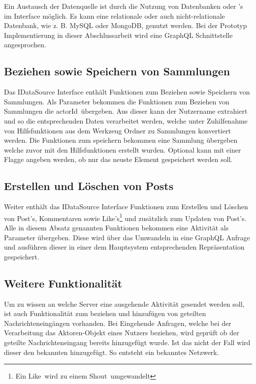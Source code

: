 Ein Austausch der Datenquelle ist durch die Nutzung von Datenbanken oder 's im Interface möglich. Es kann eine relationale oder auch nicht-relationale Datenbank, wie z. B. MySQL oder MongoDB, genutzt werden. Bei der Prototyp Implementierung in dieser Abschlussarbeit wird eine GraphQL Schnittstelle angesprochen.

\subsection{Beziehen sowie Speichern von Sammlungen}
Das IDataSource Interface enthält Funktionen zum Beziehen sowie Speichern von Sammlungen. Als Parameter bekommen die Funktionen zum Beziehen von Sammlungen die \glqq actorId\grqq~übergeben. Aus dieser kann der Nutzername extrahiert und so die entsprechenden Daten verarbeitet werden, welche unter Zuhilfenahme von Hilfsfunktionen aus dem Werkzeug Ordner zu Sammlungen konvertiert werden. Die Funktionen zum speichern bekommen eine Sammlung übergeben welche zuvor mit den Hilfsfunktionen erstellt wurden. Optional kann mit einer Flagge angeben werden, ob nur das neuste Element gespeichert werden soll.

\subsection{Erstellen und Löschen von Posts}
Weiter enthält das IDataSource Interface Funktionen zum Erstellen und Löschen von \glqq Post's\grqq, Kommentaren sowie \glqq Like's\grqq\footnote{Ein \glqq Like\grqq~wird zu einem \glqq Shout\grqq~umgewandelt} und zusätzlich zum Updaten von \glqq Post's\grqq. Alle in diesem Absatz genannten Funktionen bekommen eine Aktivität als Parameter übergeben. Diese wird über das Umwandeln in eine GraphQL Anfrage und ausführen dieser in einer dem Hauptsystem entsprechenden Repräsentation gespeichert.

\subsection{Weitere Funktionalität}
Um zu wissen an welche Server eine ausgehende Aktivität gesendet werden soll, ist auch Funktionalität zum beziehen und hinzufügen von geteilten Nachrichteneingängen vorhanden. Bei Eingehende Anfragen, welche bei der Verarbeitung das Aktoren-Objekt eines Nutzers beziehen, wird geprüft ob der geteilte Nachrichteneingang bereits hinzugefügt wurde. Ist das nicht der Fall wird dieser den bekannten hinzugefügt. So entsteht ein \glqq bekanntes Netzwerk\grqq.\\

